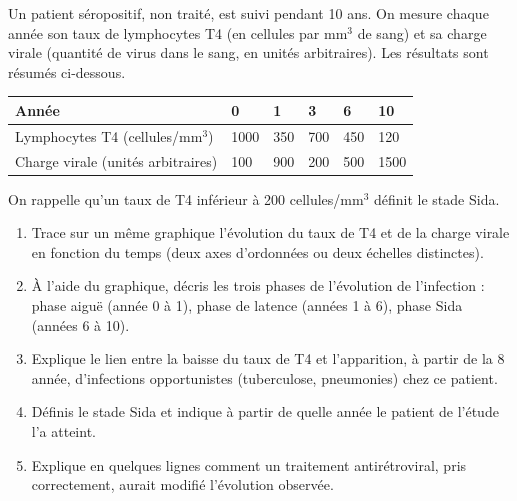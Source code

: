 \documentclass[11pt]{article}
\begin{document}
\begin{exercice}
Un patient séropositif, non traité, est suivi pendant 10 ans. On mesure chaque année son taux de lymphocytes T4 (en cellules par mm$^3$ de sang) et sa charge virale (quantité de virus dans le sang, en unités arbitraires). Les résultats sont résumés ci-dessous.

\begin{center}
\begin{tabularx}{\linewidth}{|l|X|X|X|X|X|}\hline
\rowcolor{popblueL} \textbf{Année} & \textbf{0} & \textbf{1} & \textbf{3} & \textbf{6} & \textbf{10} \\ \hline
Lymphocytes T4 (cellules/mm$^3$) & 1000 & 350 & 700 & 450 & 120 \\ \hline
Charge virale (unités arbitraires) & 100 & 900 & 200 & 500 & 1500 \\ \hline
\end{tabularx}
\end{center}

On rappelle qu'un taux de T4 inférieur à 200 cellules/mm$^3$ définit le stade Sida.
\begin{enumerate}
\item Trace sur un même graphique l'évolution du taux de T4 et de la charge virale en fonction du temps (deux axes d'ordonnées ou deux échelles distinctes).
\item À l'aide du graphique, décris les trois phases de l'évolution de l'infection : phase aiguë (année 0 à 1), phase de latence (années 1 à 6), phase Sida (années 6 à 10).
\item Explique le lien entre la baisse du taux de T4 et l'apparition, à partir de la 8\ieme{} année, d'infections opportunistes (tuberculose, pneumonies) chez ce patient.
\item Définis le stade Sida et indique à partir de quelle année le patient de l'étude l'a atteint.
\item Explique en quelques lignes comment un traitement antirétroviral, pris correctement, aurait modifié l'évolution observée.
\end{enumerate}
\end{exercice}
\end{document}
